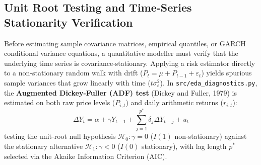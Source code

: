 \documentclass[11pt,a4paper]{article}
\begin{document}
\subsection{Unit Root Testing and Time-Series Stationarity Verification}

Before estimating sample covariance matrices, empirical quantiles, or GARCH conditional variance equations, a quantitative modeller must verify that the underlying time series is covariance-stationary. Applying a risk estimator directly to a non-stationary random walk with drift ($P_t = \mu + P_{t-1} + \varepsilon_t$) yields spurious sample variances that grow linearly with time ($t\sigma_\varepsilon^2$). In \texttt{src/eda\_diagnostics.py}, the \textbf{Augmented Dickey-Fuller (ADF) test} (Dickey and Fuller, 1979) is estimated on both raw price levels ($P_{i,t}$) and daily arithmetic returns ($r_{i,t}$):
\begin{equation}
\Delta Y_t = \alpha + \gamma Y_{t-1} + \sum_{j=1}^{p^*} \delta_j \Delta Y_{t-j} + u_t
\end{equation}
testing the unit-root null hypothesis $\mathcal{H}_0: \gamma = 0$ ($I(1)$ non-stationary) against the stationary alternative $\mathcal{H}_1: \gamma < 0$ ($I(0)$ stationary), with lag length $p^*$ selected via the Akaike Information Criterion (AIC).
\end{document}
